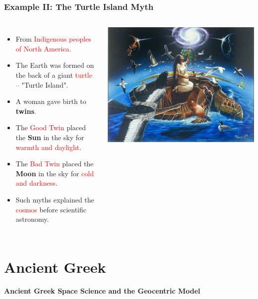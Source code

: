 \documentclass[aspectratio=1611, 9pt]{beamer}
\begin{document}
\begin{frame}
  \frametitle{Example II: The Turtle Island Myth}
  \begin{columns}
    \begin{itemize}
     \item From \textcolor{red}{Indigenous peoples of North America}.
    \item The Earth was formed on the back of a giant \textcolor{red}{turtle} -- "Turtle Island".
    \item A woman gave birth to \textbf{twins}.
    \item The \textcolor{red}{Good Twin} placed the \textbf{Sun} in the sky for \textcolor{red}{warmth and daylight}.
    \item The \textcolor{red}{Bad Twin} placed the \textbf{Moon} in the sky for \textcolor{red}{cold and darkness}.
    \item Such myths explained the \textcolor{red}{cosmos} before scientific astronomy.
    \end{itemize}

    \begin{center}
      \includegraphics[width=1.0\textwidth]{pictures/myth3.jpg}
    \end{center}
  \end{columns}
\end{frame}

\section{Ancient Greek}
\begin{frame}
  \begin{center}
    \textbf{Ancient Greek Space Science and the Geocentric Model}
  \end{center}
\end{frame}
\end{document}
